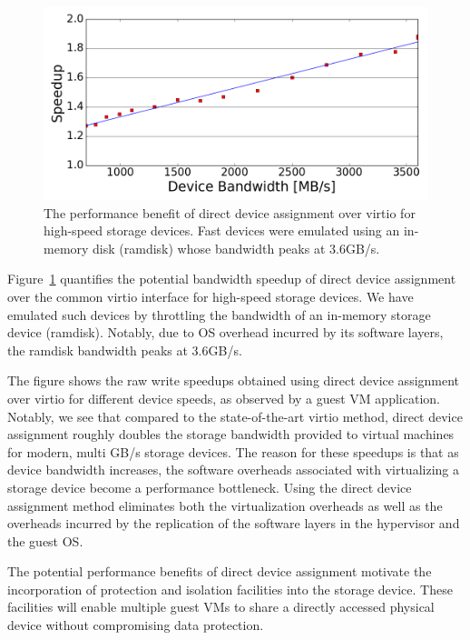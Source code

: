 
\begin{figure}[t]
  \centering
  \includegraphics[width=\columnwidth]{figs/motivation.png}
  \caption{The performance benefit of direct device assignment over virtio for high-speed storage devices. Fast devices were emulated using an in-memory disk (ramdisk) whose bandwidth peaks at 3.6GB/s.
    \label{fig:directperf}}
  \end{figure}

Figure~\ref{fig:directperf} quantifies the potential bandwidth speedup of direct device assignment over the common virtio interface for high-speed storage devices. We have emulated such devices by throttling the bandwidth of an in-memory storage device (ramdisk). Notably, due to OS overhead incurred by its software layers, the ramdisk bandwidth peaks at 3.6GB/s. 

The figure shows the raw write speedups obtained using direct device assignment over virtio for different device speeds, as observed by a guest VM application.
Notably, we see that compared to the state-of-the-art virtio method, direct device assignment roughly doubles the storage bandwidth provided to virtual machines for modern, multi GB/s storage devices.
The reason for these speedups is that as device bandwidth increases, the software overheads associated with virtualizing a storage device become a performance bottleneck.
Using the direct device assignment method eliminates both the virtualization overheads as well as the overheads incurred by the replication of the software layers in the hypervisor and the guest OS.

The potential performance benefits of direct device assignment motivate the incorporation of protection and isolation facilities into the storage device. These facilities will enable multiple guest VMs to share a directly accessed physical device without compromising data protection.

